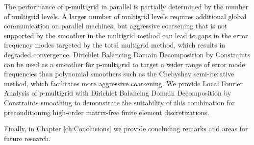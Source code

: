 The performance of p-multigrid in parallel is partially determined by the number of multigrid levels.
A larger number of multigrid levels requires additional global communication on parallel machines, but aggressive coarsening that is not supported by the smoother in the multigrid method can lead to gaps in the error frequency modes targeted by the total multigrid method, which results in degraded convergence.
Dirichlet Balancing Domain Decomposition by Constraints can be used as a smoother for p-multigrid to target a wider range of error mode frequencies than polynomial smoothers such as the Chebyshev semi-iterative method, which facilitates more aggressive coarsening.
We provide Local Fourier Analysis of p-multigrid with Dirichlet Balancing Domain Decomposition by Constraints smoothing to demonstrate the suitability of this combination for preconditioning high-order matrix-free finite element discretizations.

Finally, in Chapter \ref{ch:Conclusions} we provide concluding remarks and areas for future research.
